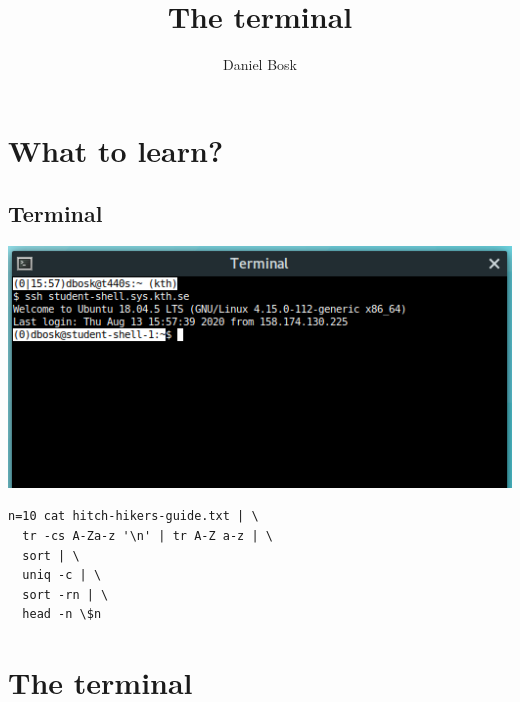 \title{%
  The terminal
}
\author{Daniel Bosk}


\mode*


\section{What to learn?}

\subsection{Terminal}

\begin{frame}
  \includegraphics[width=\columnwidth]{../../terminal/terminal.png}
\end{frame}

\begin{frame}[fragile]
  \begin{lstlisting}[numbers=none]
n=10 cat hitch-hikers-guide.txt | \
  tr -cs A-Za-z '\n' | tr A-Z a-z | \
  sort | \
  uniq -c | \
  sort -rn | \
  head -n \$n
  \end{lstlisting}
\end{frame}


\section{The terminal}


